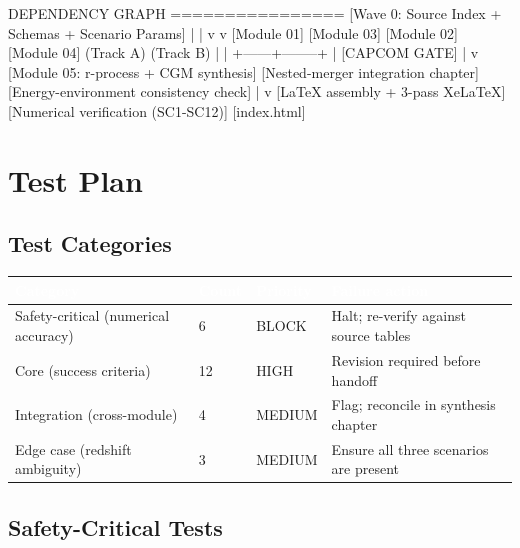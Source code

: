\documentclass[11pt,letterpaper]{article}
\newcommand{\tableheader}[1]{\textbf{\sffamily\textcolor{white}{#1}}}
\begin{document}
\begin{asciibox}
DEPENDENCY GRAPH
================
[Wave 0: Source Index + Schemas + Scenario Params]
          |              |
          v              v
   [Module 01]       [Module 03]
   [Module 02]       [Module 04]
   (Track A)         (Track B)
          |              |
          +------+--------+
                 |
          [CAPCOM GATE]
                 |
                 v
          [Module 05: r-process + CGM synthesis]
          [Nested-merger integration chapter]
          [Energy-environment consistency check]
                 |
                 v
          [LaTeX assembly + 3-pass XeLaTeX]
          [Numerical verification (SC1-SC12)]
          [index.html]
\end{asciibox}

\section{Test Plan}

\subsection{Test Categories}

\begin{center}
\begin{tabularx}{\textwidth}{L{3cm}C{1.5cm}C{2cm}L{4.5cm}}
\toprule
{}
\tableheader{Category} & \tableheader{Count} & \tableheader{Priority} & \tableheader{Failure action} \\
\midrule
Safety-critical (numerical accuracy) & 6 & BLOCK & Halt; re-verify against source tables \\
Core (success criteria) & 12 & HIGH & Revision required before handoff \\
Integration (cross-module) & 4 & MEDIUM & Flag; reconcile in synthesis chapter \\
Edge case (redshift ambiguity) & 3 & MEDIUM & Ensure all three scenarios are present \\
\bottomrule
\end{tabularx}
\end{center}

\subsection{Safety-Critical Tests}
\end{document}
